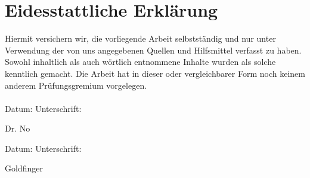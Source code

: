 \thispagestyle{empty}
\section*{Eidesstattliche Erklärung}
\label{sec:erklaerung}

Hiermit versichern wir, die vorliegende Arbeit selbstständig und nur unter Verwendung der von uns angegebenen Quellen und Hilfsmittel verfasst zu haben. Sowohl inhaltlich als auch wörtlich entnommene Inhalte wurden als solche kenntlich gemacht. Die Arbeit hat in dieser oder vergleichbarer Form noch keinem anderem Prüfungsgremium vorgelegen. \\
\\[1.5cm]
Datum:	\hrulefill\enspace Unterschrift: \hrulefill
\\
\begin{flushright}
\large Dr. No \\[1.5cm]
\end{flushright}

Datum:	\hrulefill\enspace Unterschrift: \hrulefill \\
\begin{flushright}
\large Goldfinger \\[1.5cm]
\end{flushright}
